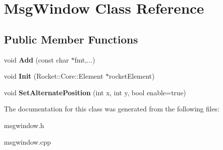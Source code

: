 \hypertarget{classMsgWindow}{\section{\-Msg\-Window \-Class \-Reference}
\label{classMsgWindow}
}
\subsection*{\-Public \-Member \-Functions}
\begin{DoxyCompactItemize}
\item 
\hypertarget{classMsgWindow_a571ae13878e4ab906c0fd03988b79217}{void {\bfseries \-Add} (const char $\ast$fmt,...)}\label{classMsgWindow_a571ae13878e4ab906c0fd03988b79217}

\item 
\hypertarget{classMsgWindow_a31f6a0258264e36673062528d35a51cf}{void {\bfseries \-Init} (\-Rocket\-::\-Core\-::\-Element $\ast$rocket\-Element)}\label{classMsgWindow_a31f6a0258264e36673062528d35a51cf}

\item 
\hypertarget{classMsgWindow_ad2fc0ab2dd008aff2b6eb3bbfd3ead74}{void {\bfseries \-Set\-Alternate\-Position} (int x, int y, bool enable=true)}\label{classMsgWindow_ad2fc0ab2dd008aff2b6eb3bbfd3ead74}

\end{DoxyCompactItemize}


\-The documentation for this class was generated from the following files\-:\begin{DoxyCompactItemize}
\item 
msgwindow.\-h\item 
msgwindow.\-cpp\end{DoxyCompactItemize}
